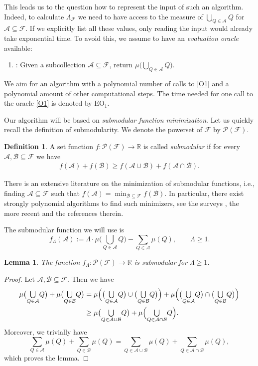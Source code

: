 \documentclass[a4paper, oneside,11pt]{amsart}
\newtheorem{lemma}[theorem]{Lemma}
\theoremstyle{definition}
\newtheorem{definition}[theorem]{Definition}
\theoremstyle{remark}
\numberwithin{equation}{section}
\newcommand{\R}{\ensuremath{\mathbb{R}}}
\newcommand{\mc}{\mathcal}
\newcommand{\hab}[1]{\bigl(#1\bigr)}
\newcommand{\bcup}[1]{{\textstyle\bigcup\limits_{#1}}}
\newcommand{\has}[1]{\Bigl(#1\Bigr)}
\begin{document}
This leads us to the question how to represent the input of such an algorithm. Indeed, to calculate $\Lambda_{\mc{F}}$ we need to have access to the measure of $\bigcup_{Q\in\mathcal{A}}Q$ for $\mc{A} \subseteq \mc{F}$. If we explicitly list all these values, only reading the input would already take exponential time. To avoid this, we assume to have an \emph{evaluation oracle} available:
\begin{enumerate}[($\mathrm{O}_1$)]
  \item : Given a subcollection $\mc{A}\subseteq \mc{F}$, return $\mu\hab{\bigcup_{Q\in\mathcal{A}}Q}$. \label{O1}
\end{enumerate}
We aim for an algorithm with a polynomial number of calls to \ref{O1} and a polynomial amount of other computational steps. The time needed for one call to the oracle \ref{O1} is denoted by $\mathrm{EO}_1$.

Our algorithm will be based on \emph{submodular function minimization}. Let us quickly recall the definition of submodularity. We denote the powerset of $\mc{F}$ by $\mc{P}(\mc{F})$.
\begin{definition}
A set function $f \colon \mc{P}(\mc{F})\to \R$ is called \emph{submodular} if for every $\mc{A},\mc{B} \subseteq \mc{F}$ we have
\begin{align*}
  f(\mc{A})+f(\mc{B}) \geq f(\mc{A}\cup \mc{B} ) +f(\mc{A}\cap \mc{B} ).
\end{align*}
\end{definition}
There is an extensive literature on the minimization of submodular functions, i.e., finding $\mc{A} \subseteq \mc{F}$ such that $f(\mc{A}) = \min_{\mc{B} \subseteq \mc{F}} f(\mc{B})$. In particular, there exist strongly polynomial algorithms to find such minimizers, see the surveys \cite{Iw08,mc05}, the more recent \cite{JLSZ24,Ji22} and the references therein.


The submodular function we will use  is
 $$
  f_\Lambda(\mc{A}) := \Lambda \cdot \mu\hab{\bcup{Q\in\mathcal{A}}Q} - \sum_{Q \in \mc{A}} \mu(Q), \qquad \Lambda \geq 1.
  $$

\begin{lemma}\label{lemm:submodular}
 The function $f_\Lambda\colon \mc{P}(\mc{F}) \to \R$ is submodular for $\Lambda \geq 1$.
\end{lemma}

\begin{proof}
  Let $\mc{A},\mc{B} \subseteq \mc{F}$. Then we have
  \begin{align*}
    \mu\hab{\bcup{Q\in\mathcal{A}}Q} + \mu\hab{\bcup{Q\in\mathcal{B}}Q} &= \mu\has{\hab{\bcup{Q\in \mathcal{A}}Q}\cup \hab{\bcup{Q\in\mathcal{B}}Q}}+ \mu\has{\hab{\bcup{Q\in\mathcal{A}}Q} \cap \hab{\bcup{Q\in\mathcal{B}}Q}}
     \\ &\geq \mu\hab{\bcup{Q\in\mathcal{A}\cup \mathcal{B}}Q}+ \mu\has{{\bcup{Q\in\mathcal{A} \cap \mathcal{B}}Q}}.
  \end{align*}
  Moreover, we trivially have
  $$
  \sum_{Q \in \mc{A}} \mu(Q)+\sum_{Q \in \mc{B}} \mu(Q) = \sum_{Q \in \mc{A}\cup \mc{B}} \mu(Q)+\sum_{Q \in \mc{A}\cap \mc{B}} \mu(Q),
  $$
  which proves the lemma.
\end{proof}
\end{document}
